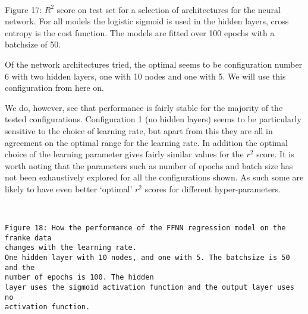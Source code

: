 \documentclass[11pt]{article}
\begin{document}
    \begin{center}
    \end{center}
    { \hspace*{\fill} \\}
    
    Figure 17: \(R^2\) score on test set for a selection of architectures
for the neural network. For all models the logistic sigmoid is used in
the hidden layers, cross entropy is the cost function. The models are
fitted over 100 epochs with a batchsize of 50.

    Of the network architectures tried, the optimal seems to be
configuration number 6 with two hidden layers, one with 10 nodes and one
with 5. We will use this configuration from here on.

We do, however, see that performance is fairly stable for the majority
of the tested configurations. Configuration 1 (no hidden layers) seems to be
particularly sensitive to the choice of learning rate, but apart from
this they are all in agreement on the optimal range for the learning
rate. In addition the optimal choice of the learning parameter gives
fairly similar values for the \(r^2\) score. It is worth noting that the
parameters such as number of epochs and batch size has not been
exhaustively explored for all the configurations shown. As such some are
likely to have even better `optimal' \(r^2\) scores for different
hyper-parameters.

    \begin{center}
    \end{center}
    { \hspace*{\fill} \\}
   
    \begin{Verbatim}[commandchars=\\\{\}]
Figure 18: How the performance of the FFNN regression model on the franke data
changes with the learning rate.
One hidden layer with 10 nodes, and one with 5. The batchsize is 50 and the
number of epochs is 100. The hidden
layer uses the sigmoid activation function and the output layer uses no
activation function.
    \end{Verbatim}

    \begin{center}
    \end{center}
    { \hspace*{\fill} \\}
    
\end{document}
